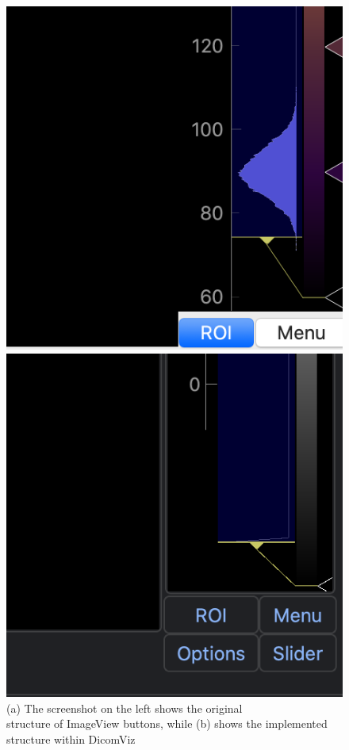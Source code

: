 \documentclass[conference]{IEEEtran}
\begin{document}
 \begin{figure}[h]
    \begin{minipage}{.49\columnwidth}
        \includegraphics[width=\columnwidth]{orig.png}
        \subcaption{}
    \end{minipage}\hfill
    \begin{minipage}{.49\columnwidth}
        \includegraphics[width=\columnwidth]
        {but.png}
        \subcaption{}
    \end{minipage}
    \caption{(a) The screenshot on the left shows the original \\ structure of ImageView buttons, while (b) shows the implemented structure within DicomViz}
\end{figure}
\end{document}
